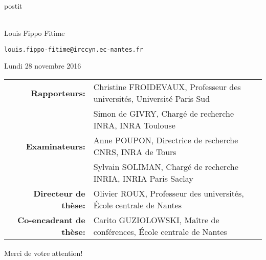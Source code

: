 \documentclass[fleqn,10pt,c]{beamer}
\begin{document}
\begin{frame}[plain,label=title]

\begin{center}
\vspace{1cm}
\begin{beamercolorbox}[sep=0.5em]{postit}
\centering
\Large
\textbf{%
{\normalsize\theconference{}}\\~\\%
\inserttitle
}
\end{beamercolorbox}

\par
\medskip
\normalsize
Louis Fippo Fitime
\footnotesize

\texttt{louis.fippo-fitime@irccyn.ec-nantes.fr}


\normalsize
\bigskip
Lundi 28 novembre 2016

\medskip

{\scriptsize
\begin{tabular}{rl}
\textbf{Rapporteurs:} & Christine FROIDEVAUX, Professeur des universités, Université Paris Sud\\
                      & Simon de GIVRY, Chargé de recherche INRA, INRA Toulouse \\
\textbf{Examinateurs:} & Anne POUPON, Directrice de recherche CNRS, INRA de Tours\\
                      & Sylvain SOLIMAN, Chargé de recherche INRIA, INRIA Paris Saclay\\
                       
\textbf{Directeur de thèse:} & Olivier ROUX, Professeur des universités, \'Ecole centrale de Nantes\\
\textbf{Co-encadrant de thèse:} & Carito GUZIOLOWSKI, Maître de conférences, \'Ecole centrale de Nantes\\

\end{tabular}
}

\end{center}
\medskip
{\centering
Merci de votre attention!
}
\end{frame}




%
\end{document}
